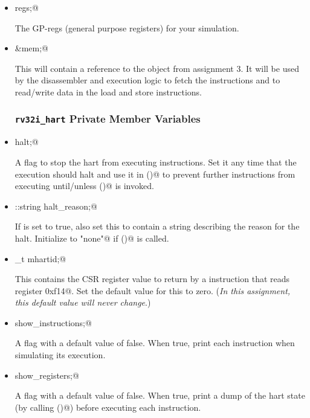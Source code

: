 \documentclass{article}
\begin{document}
\begin{itemize}

\item \verb@registerfile regs;@

The GP-regs (general purpose registers) for your simulation.

\item \verb@memory &mem;@

This will contain a reference to the \verb@memory@ object from assignment 3.
It will be used by the disassembler and execution logic to fetch the instructions
and to read/write data in the load and store instructions.






\subsubsection{{\tt rv32i\_hart} Private Member Variables}

\item \verb@bool halt;@

A flag to stop the hart from executing instructions.  Set it any time 
that the execution should halt and use it in \verb@tick()@ to prevent
further instructions from executing until/unless \verb@reset()@ is invoked.

\item \verb@std::string halt_reason;@

If \verb@halt@ is set to true, also set this to contain a string describing
the reason for the halt.
Initialize to \verb@"none"@ if \verb@reset()@ is called.

\item {}_t mhartid;@

This contains the CSR register value to return by a \verb@csrrs@ instruction that
reads register \verb@0xf14@.  Set the default value for this to zero. ({\em In this
assignment, this default value will never change}.)

\item \verb@bool show_instructions;@

A flag with a default value of false.  When true, print each instruction
when simulating its execution.  

\item \verb@bool show_registers;@

A flag with a default value of false.  When true, print a dump of the hart state 
(by calling \verb@dump()@) before executing each instruction.


\end{itemize}
\end{document}
